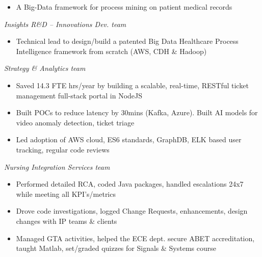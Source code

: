 \documentclass[10pt,a4paper,ragged2e,withhyper]{altacv}
\begin{document}
\begin{paracol}{2}


\begin{itemize}
\item A Big-Data framework for process mining on patient medical records  
\end{itemize}


\emph{Insights R\&D -- Innovations Dev. team}
\begin{itemize}
\item Technical lead to design/build a patented Big Data Healthcare Process Intelligence framework from scratch (AWS, CDH \& Hadoop)
\end{itemize}

\divider

\emph{Strategy \& Analytics team}
\begin{itemize}
\item Saved 14.3 FTE hrs/year by building a scalable, real-time, RESTful ticket management full-stack portal in NodeJS
\item Built POCs to reduce latency by 30mins (Kafka, Azure). Built AI models for video anomaly detection, ticket triage
\item Led adoption of AWS cloud, ES6 standards, GraphDB, ELK based user tracking, regular code reviews
\end{itemize}

\divider

\emph{Nursing Integration Services team}
\begin{itemize}
\item Performed detailed RCA, coded Java packages, handled escalations 24x7 while meeting all KPI’s/metrics
\item Drove code investigations, logged Change Requests, enhancements, design changes with IP teams \& clients
\end{itemize}

\divider

\begin{itemize}
\item Managed GTA activities, helped the ECE dept. secure ABET accreditation, taught Matlab, set/graded quizzes for Signals \& Systems course
\end{itemize}


\end{paracol}
\end{document}
